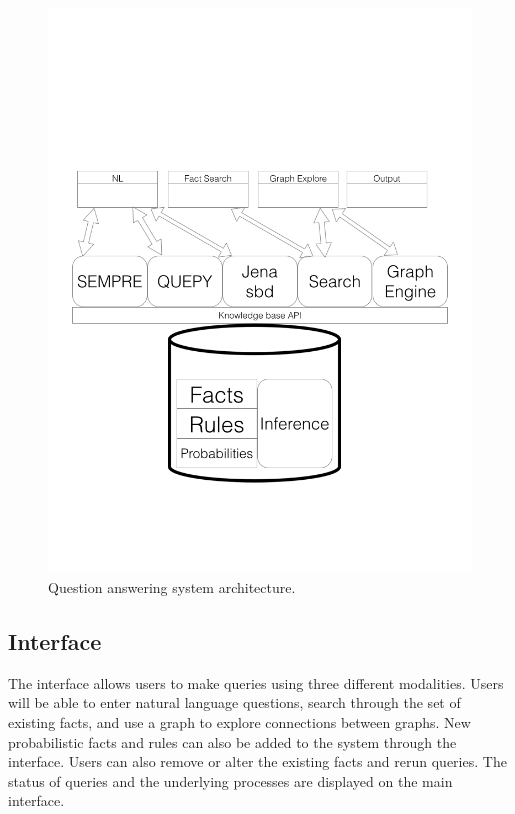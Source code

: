 

\begin{figure}
\includegraphics[width=\columnwidth,clip=true,trim=0cm 4cm 0cm 10cm]{images/qaarchitecture.png}
\caption{Question answering system architecture.}
\label{fig:qaarchitecture}
\end{figure}


\subsection{Interface}
\label{sec:probqa-interface}

The interface allows users to make queries using three different modalities.
Users will be able to enter natural language questions, search through the set of existing facts, and use a graph to explore connections between graphs.
New probabilistic facts and rules can also be added to the system through the interface.
Users can also remove or alter the existing facts and rerun queries.
The status of queries and the underlying processes are displayed on the main interface.

